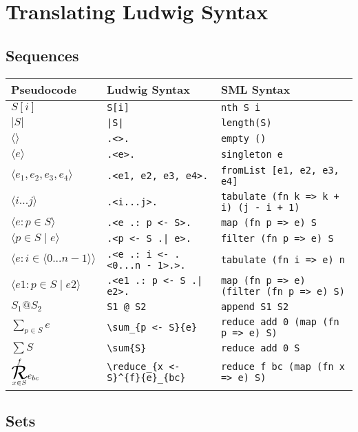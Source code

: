 \section{Translating Ludwig Syntax}

\subsection{Sequences}

\begin{tabular}{| l l l |}
\hline
\textbf{Pseudocode} & \textbf{Ludwig Syntax} & \textbf{SML Syntax}\\
\hline
$S[i]$ & \verb"S[i]" & \verb"nth S i"\\
$|S|$ & \verb"|S|" & \verb"length(S)"\\
$\langle \rangle$ & \verb".<>." & \verb"empty ()"\\
$\langle e \rangle$ & \verb".<e>." & \verb"singleton e"\\
$\langle e_1, e_2, e_3, e_4 \rangle$ & \verb".<e1, e2, e3, e4>." & \verb"fromList [e1, e2, e3, e4]"\\
$\langle i...j \rangle$ & \verb".<i...j>." & \verb"tabulate (fn k => k + i) (j - i + 1)"\\
$\langle e : p \in S \rangle$ & \verb".<e .: p <- S>." & \verb"map (fn p => e) S"\\
$\langle p \in S \mid e \rangle$ & \verb".<p <- S .| e>." & \verb"filter (fn p => e) S"\\
$\langle e : i \in \langle 0...n - 1 \rangle \rangle$ & \verb".<e .: i <- .<0...n - 1>.>." & \verb"tabulate (fn i => e) n"\\
$\langle e1 : p \in S \mid e2 \rangle$ & \verb".<e1 .: p <- S .| e2>." & \verb"map (fn p => e) (filter (fn p => e) S)"\\
$S_1 @ S_2$ & \verb"S1 @ S2" & \verb"append S1 S2"\\
$\displaystyle \sum_{p \in S}{e}$ & \verb"\sum_{p <- S}{e}" & \verb"reduce add 0 (map (fn p => e) S)"\\
$\displaystyle \sum{S}$ & \verb"\sum{S}" & \verb"reduce add 0 S"\\
$\overset{f}{\underset{x \in S}{\reduce}}{e}_{bc}$ & \verb"\reduce_{x <- S}^{f}{e}_{bc}" & \verb"reduce f bc (map (fn x => e) S)"\\
\hline
\end{tabular}

\subsection{Sets}


